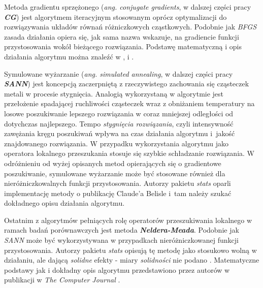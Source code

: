 \par
Metoda gradientu sprzężonego (\emph{ang. conjugate gradients}, w dalszej części pracy \emph{\textbf{CG}}) jest algorytmem iteracyjnym stosowanym oprócz optymalizacji do rozwiązywania układów równań różniczkowych cząstkowych. Podobnie jak \emph{BFGS} zasada działania opiera się, jak sama nazwa wskazuje, na gradiencie funkcji przystosowania wokół bieżącego rozwiązania. Podstawę matematyczną i opis działania algorytmu można znaleźć w \cite{fletcher1964function}, \cite{Nash90a} i \cite{nocedal2006numerical}.
\par
Symulowane wyżarzanie (\emph{ang. simulated annealing}, w dalszej części pracy \emph{\textbf{SANN}}) jest koncepcją zaczerpniętą z rzeczywistego zachowania się cząsteczek metali w procesie stygnięcia. Analogią wykorzystaną w algorytmie jest przełożenie spadającej ruchliwości cząsteczek wraz z obniżaniem temperatury na losowe poszukiwanie lepszego rozwiązania w coraz mniejszej odległości od dotychczas najlepszego. Tempo \emph{stygnięcia rozwiązania}, czyli intensywność zawężania kręgu poszukiwań wpływa na czas działania algorytmu i~jakość znajdowanego rozwiązania. W przypadku wykorzystania algorytmu jako operatora lokalnego przeszukania stosuje się szybkie schładzanie rozwiązania. W odróżnieniu od wyżej opisanych metod opierających się o gradientowe poszukiwanie, symulowane wyżarzanie może być stosowane również dla nieróżniczkowalnych funkcji przystosowania. Autorzy pakietu \emph{stats} oparli implementację metody o publikację Claude'a Belisle \cite{belisle1992convergence} i~tam należy szukać dokładnego opisu działania algorytmu.
\par
Ostatnim z algorytmów pełniących rolę operatorów przeszukiwania lokalnego w ramach  badań porównawczych jest metoda \emph{\textbf{Neldera-Meada}}. Podobnie jak \emph{SANN} może być wykorzystywana w przypadkach nieróżniczkowanej funkcji przystosowania. Autorzy pakietu \emph{stats} opisują tę metodę jako stosukowo wolną w działaniu, ale dającą \emph{solidne} efekty - miary \emph{solidności} nie podano \cite{statsPackage}. Matematyczne podstawy jak i dokładny opis algorytmu przedstawiono przez autorów w publikacji w \emph{The Computer Journal} \cite{nelderMead1965}.


